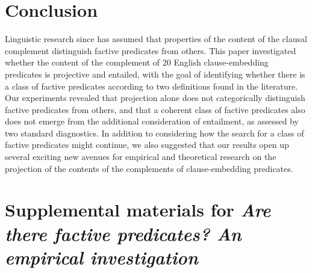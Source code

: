 \documentclass[11pt,fleqn]{article}
\newcommand{\6}{\mbox{$[\hspace*{-.6mm}[$}}
\newcommand{\9}{\mbox{$]\hspace*{-.6mm}]$}}
\begin{document}
\section{Conclusion}\label{s5}


Linguistic research since \citealt{kiparsky-kiparsky70} has assumed that properties of the content of the clausal complement distinguish factive predicates from others. This paper investigated whether the content of the complement of 20 English clause-embedding predicates is projective and entailed, with the goal of identifying whether there is a class of factive predicates according to two definitions found in the literature. Our experiments revealed that projection alone does not categorically distinguish factive predicates from others, and that a coherent class of factive predicates also does not emerge from the additional consideration of entailment, as assessed by two standard diagnostics. In addition to considering how the search for a class of factive predicates might continue, we also suggested that our results open up several exciting new avenues for empirical and theoretical research on the projection of the contents of the complements of clause-embedding predicates.





\newpage

\section*{Supplemental materials for {\em Are there factive predicates? An empirical investigation}}

\appendix

\setcounter{page}{1}

\setcounter{table}{0}
\renewcommand{\thetable}{A\arabic{table}}

\setcounter{figure}{0}
\renewcommand{\thefigure}{A\arabic{figure}}
\end{document}
